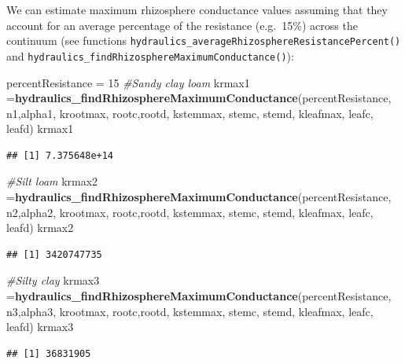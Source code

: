 \documentclass[]{book}
\newenvironment{Shaded}{\begin{snugshade}}{\end{snugshade}}
\newcommand{\KeywordTok}[1]{\textcolor[rgb]{0.13,0.29,0.53}{\textbf{#1}}}
\newcommand{\DecValTok}[1]{\textcolor[rgb]{0.00,0.00,0.81}{#1}}
\newcommand{\StringTok}[1]{\textcolor[rgb]{0.31,0.60,0.02}{#1}}
\newcommand{\CommentTok}[1]{\textcolor[rgb]{0.56,0.35,0.01}{\textit{#1}}}
\newcommand{\NormalTok}[1]{#1}
\begin{document}
We can estimate maximum rhizosphere conductance values assuming that they account for an average percentage of the resistance (e.g.~15\%) across the continuum (see functions \texttt{hydraulics\_averageRhizosphereResistancePercent()} and \texttt{hydraulics\_findRhizosphereMaximumConductance()}):

\begin{Shaded}
\begin{Highlighting}[]
\NormalTok{percentResistance =}\StringTok{ }\DecValTok{15}
\CommentTok{#Sandy clay loam }
\NormalTok{krmax1 =}\KeywordTok{hydraulics_findRhizosphereMaximumConductance}\NormalTok{(percentResistance, }
\NormalTok{                      n1,alpha1, krootmax, rootc,rootd, kstemmax, stemc, stemd,}
\NormalTok{                      kleafmax, leafc, leafd)}
\NormalTok{krmax1}
\end{Highlighting}
\end{Shaded}

\begin{verbatim}
## [1] 7.375648e+14
\end{verbatim}

\begin{Shaded}
\begin{Highlighting}[]
\CommentTok{#Silt loam}
\NormalTok{krmax2 =}\KeywordTok{hydraulics_findRhizosphereMaximumConductance}\NormalTok{(percentResistance, }
\NormalTok{                      n2,alpha2, krootmax, rootc,rootd, kstemmax, stemc, stemd,}
\NormalTok{                      kleafmax, leafc, leafd)}
\NormalTok{krmax2}
\end{Highlighting}
\end{Shaded}

\begin{verbatim}
## [1] 3420747735
\end{verbatim}

\begin{Shaded}
\begin{Highlighting}[]
\CommentTok{#Silty clay}
\NormalTok{krmax3 =}\KeywordTok{hydraulics_findRhizosphereMaximumConductance}\NormalTok{(percentResistance, }
\NormalTok{                      n3,alpha3, krootmax, rootc,rootd, kstemmax, stemc, stemd,}
\NormalTok{                      kleafmax, leafc, leafd)}
\NormalTok{krmax3}
\end{Highlighting}
\end{Shaded}

\begin{verbatim}
## [1] 36831905
\end{verbatim}
\end{document}
